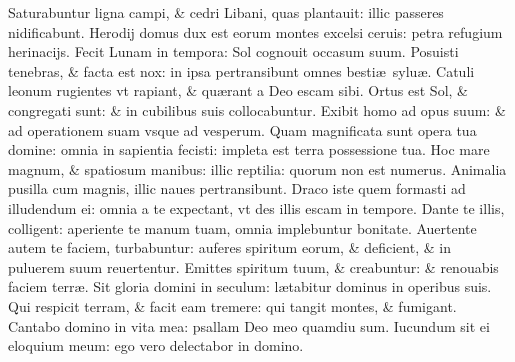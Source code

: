 \documentclass[a5paper,10pt]{book}
\def\ae{æ}
\begin{document}
\begin{multicols*}{2}
\newline \color{red} S\color{black}aturabuntur ligna campi, \& cedri Libani, quas plantauit: illic passeres nidificabunt.
\newline \color{red} H\color{black}erodij domus dux est eorum montes excelsi ceruis: petra refugium herinacijs.
\newline \color{red} F\color{black}ecit Lunam in tempora: Sol cognouit occasum suum.
\newline \color{red} P\color{black}osuisti tenebras, \& facta est nox: in ipsa pertransibunt omnes besti\ae \ sylu\ae .
\newline \color{red} C\color{black}atuli leonum rugientes vt rapiant, \& qu\ae rant a Deo escam sibi.
\newline \color{red} O\color{black}rtus est Sol, \& congregati sunt: \& in cubilibus suis collocabuntur.
\newline \color{red} E\color{black}xibit homo ad opus suum: \& ad operationem suam vsque ad vesperum.
\newline \color{red} Q\color{black}uam magnificata sunt opera tua domine: omnia in sapientia fecisti: impleta est terra possessione tua.
\newline \color{red} H\color{black}oc mare magnum, \& spatiosum manibus: illic reptilia: quorum non est numerus.
\newline \color{red} A\color{black}nimalia pusilla cum magnis, illic naues pertransibunt.
\newline \color{red} D\color{black}raco iste quem formasti ad illudendum ei: omnia a te expectant, vt des illis escam in tempore.
\newline \color{red} D\color{black}ante te illis, colligent: aperiente te manum tuam, omnia implebuntur bonitate.
\newline \color{red} A\color{black}uertente autem te faciem, turbabuntur: auferes spiritum eorum, \& deficient, \& in puluerem suum reuertentur.
\newline \color{red} E\color{black}mittes spiritum tuum, \& creabuntur: \& renouabis faciem terr\ae .
\newline \color{red} S\color{black}it gloria domini in seculum: l\ae tabitur dominus in operibus suis.
\newline \color{red} Q\color{black}ui respicit terram, \& facit eam tremere: qui tangit montes, \& fumigant.
\newline \color{red} C\color{black}antabo domino in vita mea: psallam Deo meo quamdiu sum.
\newline \color{red} I\color{black}ucundum sit ei eloquium meum: ego vero delectabor in domino.

\end{multicols*}
\end{document}
